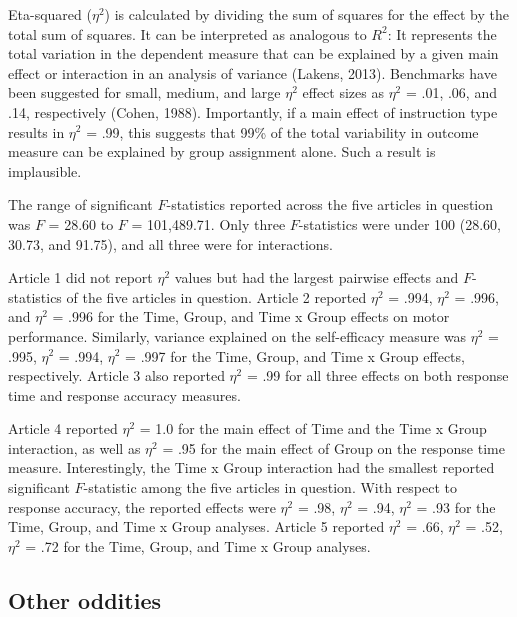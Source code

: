 \documentclass[
  english,
  man,floatsintext]{apa7}
\begin{document}
Eta-squared (\(\eta^{2}\)) is calculated by dividing the sum of squares for the effect by the total sum of squares. It can be interpreted as analogous to \(R^{2}\): It represents the total variation in the dependent measure that can be explained by a given main effect or interaction in an analysis of variance (Lakens, 2013). Benchmarks have been suggested for small, medium, and large \(\eta^{2}\) effect sizes as \(\eta^{2}\) = .01, .06, and .14, respectively (Cohen, 1988). Importantly, if a main effect of instruction type results in \(\eta^{2}\) = .99, this suggests that 99\% of the total variability in outcome measure can be explained by group assignment alone. Such a result is implausible.

The range of significant \(F\)-statistics reported across the five articles in question was \(F\) = 28.60 to \(F\) = 101,489.71. Only three \(F\)-statistics were under 100 (28.60, 30.73, and 91.75), and all three were for interactions.

Article 1 did not report \(\eta^{2}\) values but had the largest pairwise effects and \(F\)-statistics of the five articles in question. Article 2 reported \(\eta^{2}\) = .994, \(\eta^{2}\) = .996, and \(\eta^{2}\) = .996 for the Time, Group, and Time x Group effects on motor performance. Similarly, variance explained on the self-efficacy measure was \(\eta^{2}\) = .995, \(\eta^{2}\) = .994, \(\eta^{2}\) = .997 for the Time, Group, and Time x Group effects, respectively. Article 3 also reported \(\eta^{2}\) = .99 for all three effects on both response time and response accuracy measures.

Article 4 reported \(\eta^{2}\) = 1.0 for the main effect of Time and the Time x Group interaction, as well as \(\eta^{2}\) = .95 for the main effect of Group on the response time measure. Interestingly, the Time x Group interaction had the smallest reported significant \(F\)-statistic among the five articles in question. With respect to response accuracy, the reported effects were \(\eta^{2}\) = .98, \(\eta^{2}\) = .94, \(\eta^{2}\) = .93 for the Time, Group, and Time x Group analyses. Article 5 reported \(\eta^{2}\) = .66, \(\eta^{2}\) = .52, \(\eta^{2}\) = .72 for the Time, Group, and Time x Group analyses.

\hypertarget{other-oddities}{%
\subsection{Other oddities}\label{other-oddities}}
\end{document}

